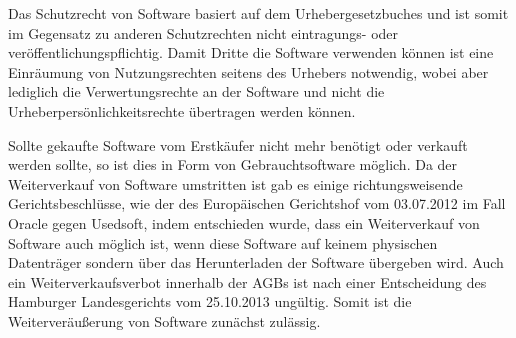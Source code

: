 Das Schutzrecht von Software basiert auf dem Urhebergesetzbuches und ist somit im Gegensatz zu anderen Schutzrechten nicht eintragungs- oder veröffentlichungspflichtig.
Damit Dritte die Software verwenden können ist eine Einräumung von Nutzungsrechten seitens des Urhebers notwendig, wobei aber lediglich die Verwertungsrechte an der
Software und nicht die Urheberpersönlichkeitsrechte übertragen werden können.

Sollte gekaufte Software vom Erstkäufer nicht mehr benötigt oder verkauft werden sollte, so ist dies in Form von Gebrauchtsoftware möglich. Da der Weiterverkauf von
Software umstritten ist gab es einige richtungsweisende Gerichtsbeschlüsse, wie der des Europäischen Gerichtshof vom 03.07.2012 im Fall Oracle gegen Usedsoft, indem
entschieden wurde, dass ein Weiterverkauf von Software auch möglich ist, wenn diese Software auf keinem physischen Datenträger sondern über das Herunterladen der Software
übergeben wird. Auch ein Weiterverkaufsverbot innerhalb der AGBs ist nach einer Entscheidung des Hamburger Landesgerichts vom 25.10.2013 ungültig. Somit ist
die Weiterveräußerung von Software zunächst zulässig.
